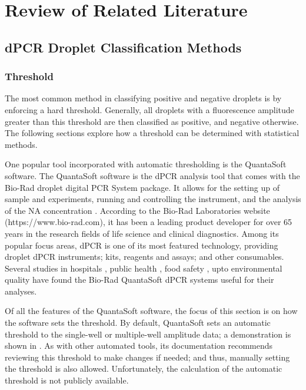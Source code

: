 \chapter{Review of Related Literature}
\label{sec:rrl} 

\section{dPCR Droplet Classification Methods}
\label{sec:dpcrclassifiers}

\subsection{Threshold}
\label{sec:threshold}
The most common method in classifying positive and negative droplets is by enforcing a hard threshold. Generally, all droplets with a fluorescence amplitude greater than this threshold are then classified as positive, and negative otherwise. The following sections explore how a threshold can be determined with statistical methods.

One popular tool incorporated with automatic thresholding is the QuantaSoft software. The QuantaSoft software is the dPCR analysis tool that comes with the Bio-Rad droplet digital PCR System package. It allows for the setting up of sample and experiments, running and controlling the instrument, and the analysis of the NA concentration \cite{BioRad2019}. According to the Bio-Rad Laboratories website (https://www.bio-rad.com), it has been a leading product developer for over 65 years in the research fields of life science and clinical diagnostics. Among its popular focus areas, dPCR is one of its most featured technology, providing droplet dPCR instruments; kits, reagents and assays; and other consumables. Several studies in hospitals \cite{Lopez2016,Chen2018,Abed2017,Tagliapietra2020}, public health \cite{Hussain2017,Nystrand2018}, food safety \cite{Chen2020,Capobianco2020,Basanisi2020}, upto environmental quality \cite{Hamaguchi2018,Jahne2020,Dobnik2016,Mauvisseau2019} have found the Bio-Rad QuantaSoft dPCR systems useful for their analyses. 

Of all the features of the QuantaSoft software, the focus of this section is on how the software sets the threshold. By default, QuantaSoft sets an automatic threshold to the single-well or multiple-well amplitude data; a demonstration is shown in . As with other automated tools, its documentation recommends reviewing this threshold to make changes if needed; and thus, manually setting the threshold is also allowed. Unfortunately, the calculation of the automatic threshold is not publicly available.

